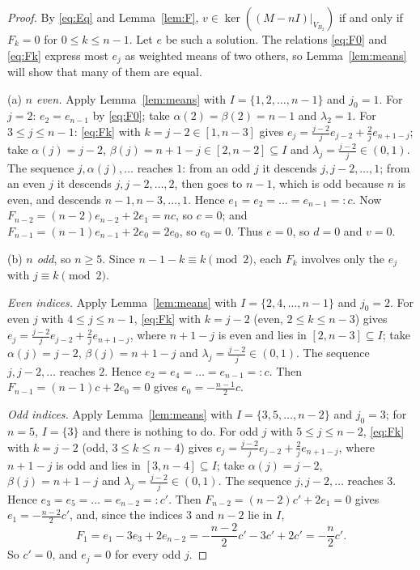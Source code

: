 \documentclass[11pt]{amsart}
\theoremstyle{plain}
\theoremstyle{definition}
\theoremstyle{remark}
\numberwithin{equation}{section}
\newcommand{\VBb}{V_{B_2}}
\begin{document}
\begin{proof}
By \eqref{eq:Eq} and Lemma~\ref{lem:F}, \(v\in\ker((M-nI)|_{\VBb})\) if and only if
\(F_k=0\) for \(0\le k\le n-1\). Let \(e\) be such a solution. The relations
\eqref{eq:F0} and \eqref{eq:Fk} express most \(e_j\) as weighted means of two others, so
Lemma~\ref{lem:means} will show that many of them are equal.

(a) \emph{\(n\) even.} Apply Lemma~\ref{lem:means} with \(I=\{1,2,\dots,n-1\}\) and
\(j_0=1\). For \(j=2\): \(e_2=e_{n-1}\) by \eqref{eq:F0}; take
\(\alpha(2)=\beta(2)=n-1\) and \(\lambda_2=1\). For \(3\le j\le n-1\): \eqref{eq:Fk}
with \(k=j-2\in[1,n-3]\) gives \(e_j=\frac{j-2}{j}e_{j-2}+\frac2je_{n+1-j}\); take
\(\alpha(j)=j-2\), \(\beta(j)=n+1-j\in[2,n-2]\subseteq I\) and
\(\lambda_j=\frac{j-2}{j}\in(0,1)\). The sequence \(j,\alpha(j),\dots\) reaches \(1\):
from an odd \(j\) it descends \(j,j-2,\dots,1\); from an even \(j\) it descends
\(j,j-2,\dots,2\), then goes to \(n-1\), which is odd because \(n\) is even, and descends
\(n-1,n-3,\dots,1\). Hence \(e_1=e_2=\dots=e_{n-1}=:c\). Now
\(F_{n-2}=(n-2)e_{n-2}+2e_1=nc\), so \(c=0\); and \(F_{n-1}=(n-1)e_{n-1}+2e_0=2e_0\), so
\(e_0=0\). Thus \(e=0\), so \(d=0\) and \(v=0\).

(b) \emph{\(n\) odd}, so \(n\ge5\). Since \(n-1-k\equiv k\pmod 2\), each \(F_k\) involves
only the \(e_j\) with \(j\equiv k\pmod 2\).

\emph{Even indices.} Apply Lemma~\ref{lem:means} with \(I=\{2,4,\dots,n-1\}\) and
\(j_0=2\). For even \(j\) with \(4\le j\le n-1\), \eqref{eq:Fk} with \(k=j-2\) (even,
\(2\le k\le n-3\)) gives \(e_j=\frac{j-2}je_{j-2}+\frac2je_{n+1-j}\), where \(n+1-j\) is
even and lies in \([2,n-3]\subseteq I\); take \(\alpha(j)=j-2\), \(\beta(j)=n+1-j\) and
\(\lambda_j=\frac{j-2}{j}\in(0,1)\). The sequence \(j,j-2,\dots\) reaches \(2\). Hence
\(e_2=e_4=\dots=e_{n-1}=:c\). Then \(F_{n-1}=(n-1)c+2e_0=0\) gives
\(e_0=-\frac{n-1}2c\).

\emph{Odd indices.} Apply Lemma~\ref{lem:means} with \(I=\{3,5,\dots,n-2\}\) and
\(j_0=3\); for \(n=5\), \(I=\{3\}\) and there is nothing to do. For odd \(j\) with
\(5\le j\le n-2\), \eqref{eq:Fk} with \(k=j-2\) (odd, \(3\le k\le n-4\)) gives
\(e_j=\frac{j-2}je_{j-2}+\frac2je_{n+1-j}\), where \(n+1-j\) is odd and lies in
\([3,n-4]\subseteq I\); take \(\alpha(j)=j-2\), \(\beta(j)=n+1-j\) and
\(\lambda_j=\frac{j-2}j\in(0,1)\). The sequence \(j,j-2,\dots\) reaches \(3\). Hence
\(e_3=e_5=\dots=e_{n-2}=:c'\). Then \(F_{n-2}=(n-2)c'+2e_1=0\) gives
\(e_1=-\frac{n-2}2c'\), and, since the indices \(3\) and \(n-2\) lie in \(I\),
\[
F_1=e_1-3e_3+2e_{n-2}=-\frac{n-2}{2}c'-3c'+2c'=-\frac n2c'.
\]
So \(c'=0\), and \(e_j=0\) for every odd \(j\).


\end{proof}
\end{document}
